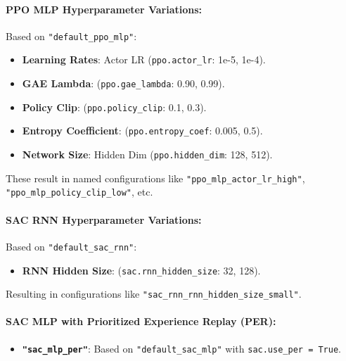 \documentclass[11pt,a4paper]{article}
\newcommand{\code}[1]{\texttt{#1}} %
\begin{document}
\paragraph{PPO MLP Hyperparameter Variations:} Based on \code{"default\_ppo\_mlp"}:
\begin{itemize}
    \item \textbf{Learning Rates}: Actor LR (\code{ppo.actor\_lr}: 1e-5, 1e-4).
    \item \textbf{GAE Lambda}: (\code{ppo.gae\_lambda}: 0.90, 0.99).
    \item \textbf{Policy Clip}: (\code{ppo.policy\_clip}: 0.1, 0.3).
    \item \textbf{Entropy Coefficient}: (\code{ppo.entropy\_coef}: 0.005, 0.5).
    \item \textbf{Network Size}: Hidden Dim (\code{ppo.hidden\_dim}: 128, 512).
\end{itemize}
These result in named configurations like \code{"ppo\_mlp\_actor\_lr\_high"}, \code{"ppo\_mlp\_policy\_clip\_low"}, etc.

\paragraph{SAC RNN Hyperparameter Variations:} Based on \code{"default\_sac\_rnn"}:
\begin{itemize}
    \item \textbf{RNN Hidden Size}: (\code{sac.rnn\_hidden\_size}: 32, 128).
\end{itemize}
Resulting in configurations like \code{"sac\_rnn\_rnn\_hidden\_size\_small"}.

\paragraph{SAC MLP with Prioritized Experience Replay (PER):}
\begin{itemize}
    \item \textbf{\code{"sac\_mlp\_per"}}: Based on \code{"default\_sac\_mlp"} with \code{sac.use\_per = True}.
\end{itemize}
\end{document}
